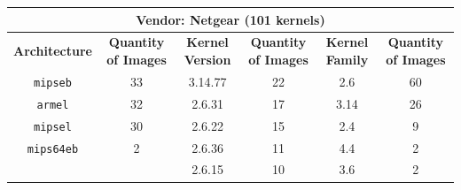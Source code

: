 \begin{table}[H]
{\begin{tabular}{|c|c|c|c|c|c|}
\multicolumn{6}{|c|}{\textbf{Vendor: Netgear} (101 kernels)}                                                                        \\ \hline
\textbf{Architecture} & \multicolumn{1}{c|}{\textbf{Quantity of Images}} & \textbf{Kernel Version} & \multicolumn{1}{c|}{\textbf{Quantity of Images}} & \textbf{Kernel Family} & \textbf{Quantity of Images} \\ \hline
{\tt mipseb}              & \multicolumn{1}{c|}{33}               & 3.14.77                 & \multicolumn{1}{c|}{22}                          & 2.6                    & 60                          \\
{\tt armel}               & \multicolumn{1}{c|}{32}               & 2.6.31                  & \multicolumn{1}{c|}{17}                          & 3.14                   & 26                          \\
{\tt mipsel}              & \multicolumn{1}{c|}{30}               & 2.6.22                  & \multicolumn{1}{c|}{15}                          & 2.4                    & 9                           \\
{\tt mips64eb}            & \multicolumn{1}{c|}{2}                & 2.6.36                  & \multicolumn{1}{c|}{11}                          & 4.4                    & 2                           \\
                          & \multicolumn{1}{c|}{}                 & 2.6.15                  & \multicolumn{1}{c|}{10}                          & 3.6                    & 2                           \\ \hline


\end{tabular}}
\end{table}
